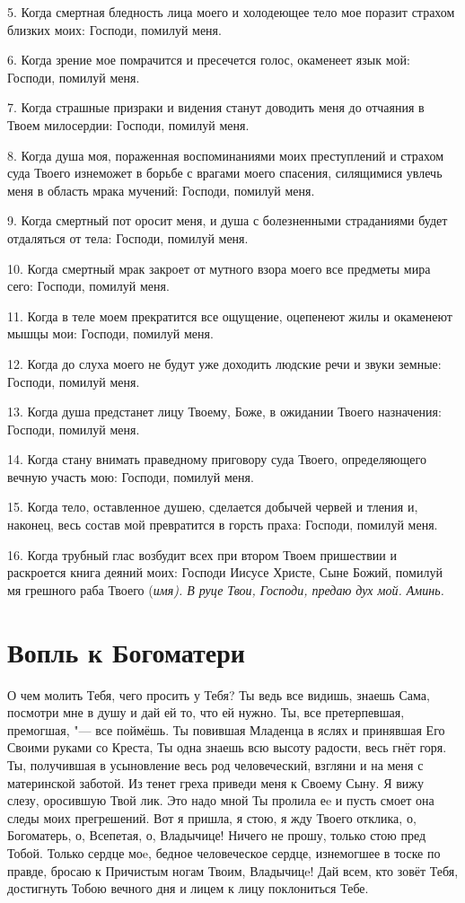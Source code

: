 5. Когда смертная бледность лица моего и холодеющее тело мое поразит страхом близких моих: Господи, помилуй меня. 

6. Когда зрение мое помрачится и пресечется голос, окаменеет язык мой: Господи, помилуй меня. 

7. Когда страшные призраки и видения станут доводить меня до отчаяния в Твоем милосердии: Господи, помилуй меня. 

8. Когда душа моя, пораженная воспоминаниями моих преступлений и страхом суда Твоего изнеможет в борьбе с врагами моего спасения, силящимися увлечь меня в область мрака мучений: Господи, помилуй меня. 

9. Когда смертный пот оросит меня, и душа с болезненными страданиями будет отдаляться от тела: Господи, помилуй меня. 

10. Когда смертный мрак закроет от мутного взора моего все предметы мира сего: Господи, помилуй меня. 

11. Когда в теле моем прекратится все ощущение, оцепенеют жилы и окаменеют мышцы мои: Господи, помилуй меня. 

12. Когда до слуха моего не будут уже доходить людские речи и звуки земные: Господи, помилуй меня. 

13. Когда душа предстанет лицу Твоему, Боже, в ожидании Твоего назначения: Господи, помилуй меня. 

14. Когда стану внимать праведному приговору суда Твоего, определяющего вечную участь мою: Господи, помилуй меня. 

15. Когда тело, оставленное душею, сделается добычей червей и тления и, наконец, весь состав мой превратится в горсть праха: Господи, помилуй меня. 

16. Когда трубный глас возбудит всех при втором Твоем пришествии и раскроется книга деяний моих: Господи Иисусе Христе, Сыне Божий, помилуй мя грешного раба Твоего (\itshape имя\normalfont{}). В руце Твои, Господи, предаю дух мой. Аминь. 





\section{Вопль к Богоматери}
 


О чем молить Тебя, чего просить у Тебя? Ты ведь все видишь, знаешь Сама, посмотри мне в душу и дай ей то, что ей нужно. Ты, все претерпевшая, премогшая, "--- все поймёшь. Ты повившая Младенца в яслях и принявшая Его Своими руками со Креста, Ты одна знаешь всю высоту радости, весь гнёт горя. Ты, получившая в усыновление весь род человеческий, взгляни и на меня с материнской заботой. Из тенет греха приведи меня к Своему Сыну. Я вижу слезу, оросившую Твой лик. Это надо мной Ты пролила еe и пусть смоет она следы моих прегрешений. Вот я пришла, я стою, я жду Твоего отклика, о, Богоматерь, о, Всепетая, о, Владычице! Ничего не прошу, только стою пред Тобой. Только сердце моe, бедное человеческое сердце, изнемогшее в тоске по правде, бросаю к Причистым ногам Твоим, Владычицe! Дай всем, кто зовёт Тебя, достигнуть Тобою вечного дня и лицем к лицу поклониться Тебе.


